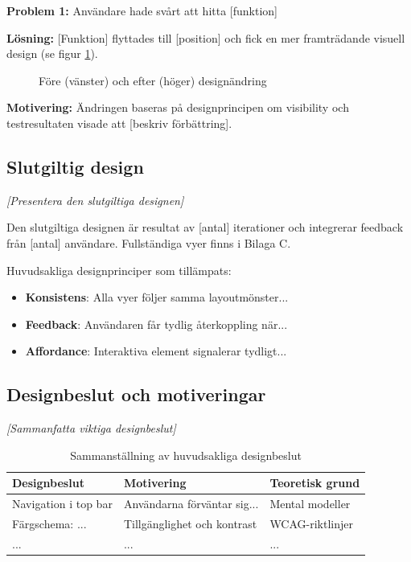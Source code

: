 \textbf{Problem 1:} Användare hade svårt att hitta [funktion]

\textbf{Lösning:} [Funktion] flyttades till [position] och fick en mer framträdande visuell design (se figur \ref{fig:forbattring1}).

\begin{figure}[h]
    \centering
    \caption{Före (vänster) och efter (höger) designändring}
    \label{fig:forbattring1}
\end{figure}

\textbf{Motivering:} Ändringen baseras på designprincipen om visibility \cite{sharp2019} och testresultaten visade att [beskriv förbättring].


\subsection{Slutgiltig design}

\textit{[Presentera den slutgiltiga designen]}

Den slutgiltiga designen är resultat av [antal] iterationer och integrerar feedback från [antal] användare. Fullständiga vyer finns i Bilaga C.

Huvudsakliga designprinciper som tillämpats:
\begin{itemize}
    \item \textbf{Konsistens}: Alla vyer följer samma layoutmönster...
    \item \textbf{Feedback}: Användaren får tydlig återkoppling när...
    \item \textbf{Affordance}: Interaktiva element signalerar tydligt...
\end{itemize}


\subsection{Designbeslut och motiveringar}

\textit{[Sammanfatta viktiga designbeslut]}

\begin{table}[h]
\centering
\begin{tabular}{|p{4cm}|p{5cm}|p{4cm}|}
\hline
\textbf{Designbeslut} & \textbf{Motivering} & \textbf{Teoretisk grund} \\
\hline
Navigation i top bar & Användarna förväntar sig... & Mental modeller \cite{sharp2019} \\
\hline
Färgschema: ... & Tillgänglighet och kontrast & WCAG-riktlinjer \\
\hline
... & ... & ... \\
\hline
\end{tabular}
\caption{Sammanställning av huvudsakliga designbeslut}
\end{table}
